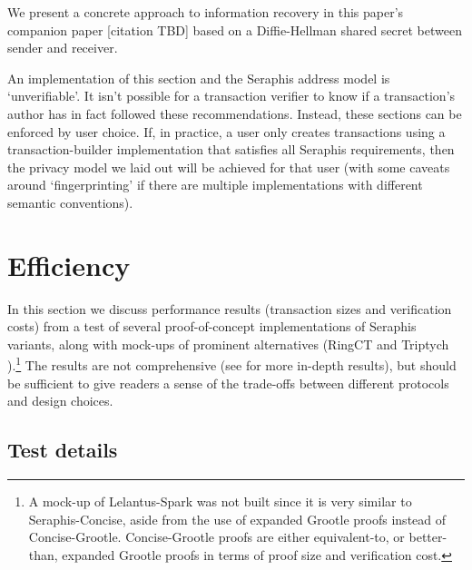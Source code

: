 We present a concrete approach to information recovery in this paper's companion paper [citation TBD] based on a Diffie-Hellman shared secret between sender and receiver.

An implementation of this section and the Seraphis address model is `unverifiable'. It isn't possible for a transaction verifier to know if a transaction's author has in fact followed these recommendations. Instead, these sections can be enforced by user choice. If, in practice, a user only creates transactions using a transaction-builder implementation that satisfies all Seraphis requirements, then the privacy model we laid out will be achieved for that user (with some caveats around `fingerprinting' if there are multiple implementations with different semantic conventions).



\section{Efficiency}
\label{sec:efficiency}

In this section we discuss performance results (transaction sizes and verification costs) from a test of several proof-of-concept implementations of Seraphis variants, along with mock-ups of prominent alternatives (RingCT \cite{MRL-0005-ringct} and Triptych \cite{triptych-preprint}).\footnote{A mock-up of Lelantus-Spark \cite{lelantus-spark} was not built since it is very similar to Seraphis-Concise, aside from the use of expanded Grootle proofs instead of Concise-Grootle. Concise-Grootle proofs are either equivalent-to, or better-than, expanded Grootle proofs in terms of proof size and verification cost.} The results are not comprehensive (see \cite{seraphis-perf-results-research-issue-91} for more in-depth results), but should be sufficient to give readers a sense of the trade-offs between different protocols and design choices.


\subsection{Test details}
\label{subsec:efficiency-test-details}

